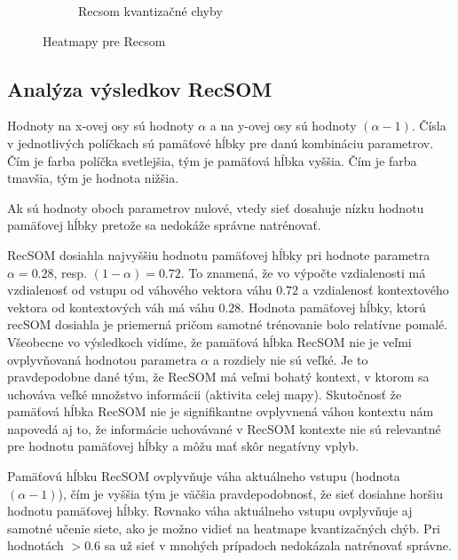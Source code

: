 \begin{figure}[H]
\begin{subfigure}{.5\textwidth}
        \caption{Recsom kvantizačné chyby}
        \label{fig:sub2}
    \end{subfigure}
    \caption{Heatmapy pre Recsom}
    \label{fig:test}
\end{figure}

\subsection{Analýza výsledkov RecSOM}

Hodnoty na x-ovej osy sú hodnoty $\alpha$  a na y-ovej 
osy sú hodnoty $(\alpha - 1)$. Čísla v jednotlivých políčkach sú pamäťové hĺbky 
pre danú kombináciu parametrov. Čím je farba políčka svetlejšia, tým je pamäťová hĺbka vyššia.
Čím je farba tmavšia, tým je hodnota nižšia.

Ak sú hodnoty oboch parametrov nulové, vtedy sieť dosahuje nízku hodnotu pamäťovej hĺbky pretože sa nedokáže správne natrénovať.


RecSOM dosiahla najvyššiu hodnotu pamäťovej hĺbky pri 
hodnote parametra $\alpha = 0.28$, resp. $(1 - \alpha) = 0.72$. To znamená, že
vo výpočte vzdialenosti má vzdialenosť od vstupu od váhového vektora váhu $0.72$
a vzdialenosť kontextového vektora od kontextových váh má váhu $0.28$.
Hodnota pamäťovej hĺbky, ktorú recSOM dosiahla je priemerná pričom samotné 
trénovanie bolo relatívne pomalé.
Všeobecne vo výsledkoch vidíme, že pamäťová hĺbka RecSOM nie je veľmi ovplyvňovaná hodnotou parametra $\alpha$ a rozdiely nie sú veľké. 
Je to pravdepodobne dané tým, že RecSOM má veľmi bohatý kontext, v ktorom sa uchováva veľké množstvo informácii (aktivita celej mapy). Skutočnosť že pamäťová hĺbka RecSOM nie
je signifikantne ovplyvnená váhou kontextu nám napovedá aj to, že informácie uchovávané v RecSOM kontexte nie sú relevantné pre hodnotu pamäťovej hĺbky a môžu mať skôr negatívny vplyb.

Pamäťovú hĺbku RecSOM ovplyvňuje váha aktuálneho vstupu
(hodnota $(\alpha - 1)$), čím je vyššia tým je väčšia pravdepodobnosť, že sieť dosiahne horšiu hodnotu pamäťovej hĺbky. Rovnako váha aktuálneho vstupu
ovplyvňuje aj samotné učenie siete, ako je možno vidieť na heatmape kvantizačných chýb. Pri hodnotách $>0.6$ sa už sieť v mnohých prípadoch nedokázala natrénovať správne.

